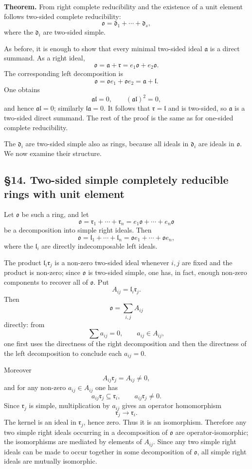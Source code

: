 \documentclass[
  11pt,
]{article}
\begin{document}
\textbf{Theorem.} From right complete reducibility and the existence of
a unit element follows two-sided complete reducibility: \[
  \mathfrak{o}=\mathfrak d_1+\cdots+\mathfrak d_s,
\] where the \(\mathfrak d_i\) are two-sided simple.

As before, it is enough to show that every minimal two-sided ideal
\(\mathfrak a\) is a direct summand. As a right ideal, \[
  \mathfrak{o}=\mathfrak a+\mathfrak r=e_1\mathfrak{o}+e_2\mathfrak{o}.
\] The corresponding left decomposition is \[
  \mathfrak{o}=\mathfrak{o}e_1+\mathfrak{o}e_2=\mathfrak a+\mathfrak l.
\] One obtains \[
  \mathfrak a\mathfrak l=0,
  \qquad
  (\mathfrak a\mathfrak l)^2=0,
\] and hence \(\mathfrak a\mathfrak l=0\); similarly
\(\mathfrak l\mathfrak a=0\). It follows that
\(\mathfrak r=\mathfrak l\) and is two-sided, so \(\mathfrak a\) is a
two-sided direct summand. The rest of the proof is the same as for
one-sided complete reducibility.

The \(\mathfrak d_i\) are two-sided simple also as rings, because all
ideals in \(\mathfrak d_i\) are ideals in \(\mathfrak{o}\). We now
examine their structure.

\subsection{§14. Two-sided simple completely reducible rings with unit
element}\label{two-sided-simple-completely-reducible-rings-with-unit-element}

Let \(\mathfrak{o}\) be such a ring, and let \[
  \mathfrak{o}=\mathfrak r_1+\cdots+\mathfrak r_n=e_1\mathfrak{o}+\cdots+e_n\mathfrak{o}
\] be a decomposition into simple right ideals. Then \[
  \mathfrak{o}=\mathfrak l_1+\cdots+\mathfrak l_n
      =\mathfrak{o}e_1+\cdots+\mathfrak{o}e_n,
\] where the \(\mathfrak l_i\) are directly indecomposable left ideals.

The product \(\mathfrak l_i\mathfrak r_j\) is a non-zero two-sided ideal
whenever \(i,j\) are fixed and the product is non-zero; since
\(\mathfrak{o}\) is two-sided simple, one has, in fact, enough non-zero
components to recover all of \(\mathfrak{o}\). Put \[
  A_{ij}=\mathfrak l_i\mathfrak r_j.
\] Then \[
  \mathfrak{o}=\sum_{i,j} A_{ij}
\] directly: from \[
  \sum a_{ij}=0,
  \qquad a_{ij}\in A_{ij},
\] one first uses the directness of the right decomposition and then the
directness of the left decomposition to conclude each \(a_{ij}=0\).

Moreover \[
  A_{ij}\mathfrak r_j=A_{ij}\ne0,
\] and for any non-zero \(a_{ij}\in A_{ij}\) one has \[
  a_{ij}\mathfrak r_j\subseteq\mathfrak r_i,
  \qquad
  a_{ij}\mathfrak r_j\ne0.
\] Since \(\mathfrak r_j\) is simple, multiplication by \(a_{ij}\) gives
an operator homomorphism \[
  \mathfrak r_j\to\mathfrak r_i.
\] The kernel is an ideal in \(\mathfrak r_j\), hence zero. Thus it is
an isomorphism. Therefore any two simple right ideals occurring in a
decomposition of \(\mathfrak{o}\) are operator-isomorphic; the
isomorphisms are mediated by elements of \(A_{ij}\). Since any two
simple right ideals can be made to occur together in some decomposition
of \(\mathfrak{o}\), all simple right ideals are mutually isomorphic.
\end{document}
